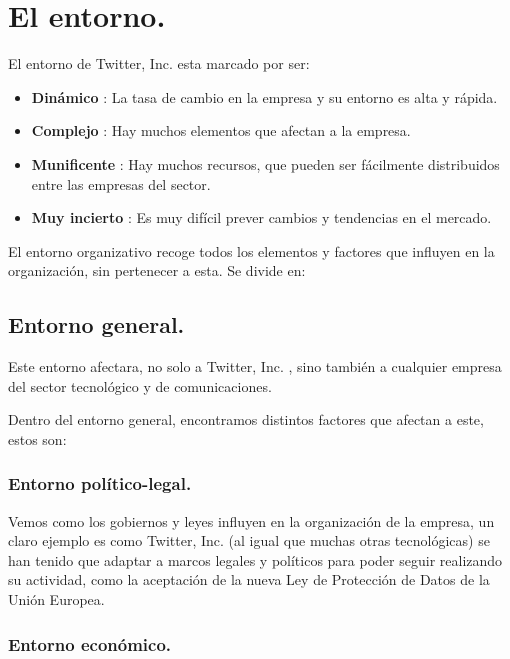 
\section{El entorno.}

El entorno de Twitter, Inc. esta marcado por ser:

\begin{itemize}

\item \textbf{Dinámico} : La tasa de cambio en la empresa y su entorno es alta y rápida.

\item \textbf{Complejo} : Hay muchos elementos que afectan a la empresa.

\item \textbf{Munificente} : Hay muchos recursos, que pueden ser fácilmente distribuidos entre las empresas del sector.

\item \textbf{Muy incierto} : Es muy difícil prever cambios y tendencias en el mercado.

\end{itemize}

El entorno organizativo recoge todos los elementos y factores que influyen en la organización, sin pertenecer a esta. Se divide en:

\subsection{Entorno general.}

Este entorno afectara, no solo a Twitter, Inc. , sino también a cualquier empresa del sector tecnológico y de comunicaciones.

Dentro del entorno general, encontramos distintos factores que afectan a este, estos son:

\subsubsection{Entorno político-legal.}

Vemos como los gobiernos y leyes influyen en la organización de la empresa, un claro ejemplo es como Twitter, Inc. (al igual que muchas otras tecnológicas) se han tenido que adaptar a marcos legales y políticos para poder seguir realizando su actividad, como la aceptación de la nueva Ley de Protección de Datos de la Unión Europea.

\subsubsection{Entorno económico.}

